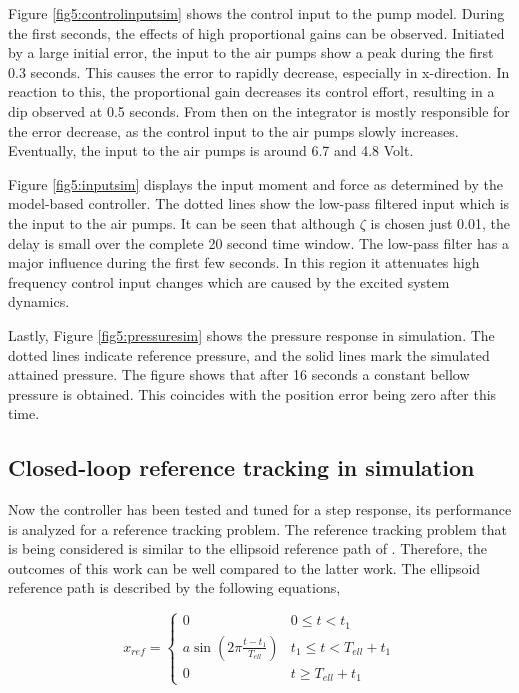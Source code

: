 Figure \ref{fig5:controlinputsim} shows the control input to the pump model. During the first seconds, the effects of high proportional gains can be observed. Initiated by a large initial error, the input to the air pumps show a peak during the first 0.3 seconds. This causes the error to rapidly decrease, especially in x-direction. In reaction to this, the proportional gain decreases its control effort, resulting in a dip observed at 0.5 seconds. From then on the integrator is mostly responsible for the error decrease, as the control input to the air pumps slowly increases. Eventually, the input to the air pumps is around 6.7 and 4.8 Volt. 

Figure \ref{fig5:inputsim} displays the input moment and force as determined by the model-based controller. The dotted lines show the low-pass filtered input which is the input to the air pumps. It can be seen that although $\zeta$ is chosen just 0.01, the delay is small over the complete 20 second time window. The low-pass filter has a major influence during the first few seconds. In this region it attenuates high frequency control input changes which are caused by the excited system dynamics. 


Lastly, Figure \ref{fig5:pressuresim} shows the pressure response in simulation. The dotted lines indicate reference pressure, and the solid lines mark the simulated attained pressure. The figure shows that after 16 seconds a constant bellow pressure is obtained. This coincides with the position error being zero after this time.



\subsection*{Closed-loop reference tracking in simulation}

Now the controller has been tested and tuned for a step response, its performance is analyzed for a reference tracking problem. The reference tracking problem that is being considered is similar to the ellipsoid reference path of \cite{berkers}. Therefore, the outcomes of this work can be well compared to the latter work. The ellipsoid reference path is described by the following equations,

\begin{equation}
    x_{ref} = \begin{cases} 
      0 &  0 \leq t < t_1 \\
     a \sin(2\pi \frac{t - t_1}{T_{ell}}) &t_1 \leq t  < T_{ell} + t_1 \\
     0 & t \geq T_{ell} + t_1
   \end{cases} 
\end{equation}

